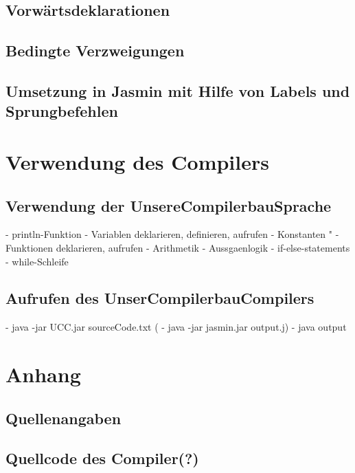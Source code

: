 \documentclass[12pt, a4paper, oneside, ngerman]{article}
\begin{document}
\subsection*{Vorwärtsdeklarationen}

\subsection{Bedingte Verzweigungen}
\subsection*{Umsetzung in Jasmin mit Hilfe von Labels und Sprungbefehlen}



\pagebreak
\section{Verwendung des Compilers}
\subsection{Verwendung der UnsereCompilerbauSprache}
	- println-Funktion
	- Variablen deklarieren, definieren, aufrufen
	- Konstanten "
	- Funktionen deklarieren, aufrufen
	- Arithmetik
	- Aussgaenlogik
	- if-else-statements
	- while-Schleife
\subsection{Aufrufen des UnserCompilerbauCompilers}
	- java -jar UCC.jar sourceCode.txt
  (	- java -jar jasmin.jar output.j)
  	- java output

\section{Anhang}
\subsection{Quellenangaben}

\subsection{Quellcode des Compiler(?)}
\end{document}
